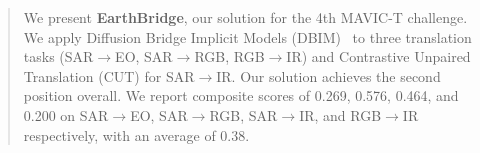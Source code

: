 \begin{abstract}
We present \textbf{EarthBridge}, our solution for the 4th MAVIC-T challenge. We apply Diffusion Bridge Implicit Models (DBIM)~\cite{zhengDiffusionBridgeImplicit2025} to three translation tasks (SAR$\rightarrow$EO, SAR$\rightarrow$RGB, RGB$\rightarrow$IR) and Contrastive Unpaired Translation (CUT) for SAR$\rightarrow$IR. Our solution achieves the second position overall. We report composite scores of 0.269, 0.576, 0.464, and 0.200 on SAR$\rightarrow$EO, SAR$\rightarrow$RGB, SAR$\rightarrow$IR, and RGB$\rightarrow$IR respectively, with an average of 0.38.
\end{abstract}
